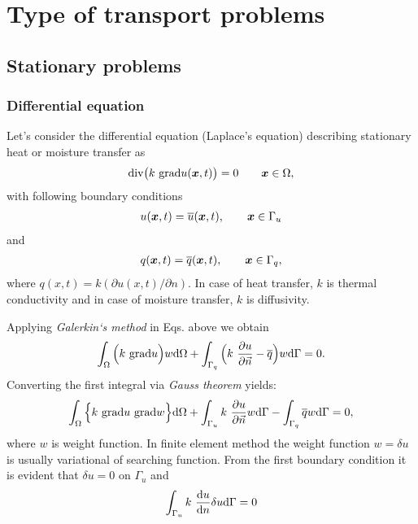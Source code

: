\chapter{Type of transport problems}
\label{typeofproblems}

\section{Stationary problems}
\label{secstationary}

\subsection{Differential equation}

Let's consider the differential equation (Laplace's equation) describing stationary heat or moisture transfer as 
\begin{eqnarray}
{\rm div} \big(k\ {\rm grad} u(\mbox{\boldmath$x$},t) \big) = 0 \qquad \mbox{\boldmath$x$} 
\in \Omega,\nonumber
\end{eqnarray}
with following boundary conditions
\begin{eqnarray}
u(\mbox{\boldmath$x$},t) = \overline{u}(\mbox{\boldmath$x$},t), \qquad \mbox{\boldmath$x$} \in \Gamma_u \nonumber
\end{eqnarray}
and
\begin{eqnarray}
q(\mbox{\boldmath$x$},t) = \overline{q}(\mbox{\boldmath$x$},t), \qquad \mbox{\boldmath$x$} \in \Gamma_q, \nonumber
\end{eqnarray}
where $q(x,t) = k (\partial  u(x,t) / \partial n)$.
In case of heat transfer, $k$ is thermal conductivity and in case of moisture transfer,
$k$ is diffusivity.

Applying {\it Galerkin`s method} in Eqs. above we obtain
\begin{eqnarray}
\int_{\Omega}\Big(k\ {\rm grad} u\Big) w {\rm d} \Omega + 
\int_{\Gamma_q}\Big(k\ \frac{\partial u}{\partial \vec{n}} - \overline{q}\Big)w {\rm d} \Gamma = 0.
\end{eqnarray}
Converting the first integral via {\it Gauss theorem} yields:
\begin{eqnarray}\label{sfem}
\int_{\Omega}\Big\{ k\ {\rm grad} u \ {\rm grad} w \Big\} {\rm d}\Omega
+ \int_{\Gamma_u} k\ \frac{\partial u}{\partial \vec{n}} w {\rm d}\Gamma - \int_{\Gamma_q} 
\overline{q} w {\rm d}\Gamma = 0,
\end{eqnarray}
where $w$ is weight function. In finite element method the weight function $w = \delta u$ is 
usually  variational of searching function.
From the first boundary condition it is evident that $\delta u = 0$ on $\Gamma_u$ and 
\begin{eqnarray}
\int_{\Gamma_u} k\ \frac{{\rm d} u}{{\rm d} n} \delta u {\rm d}\Gamma = 0
\end{eqnarray}

